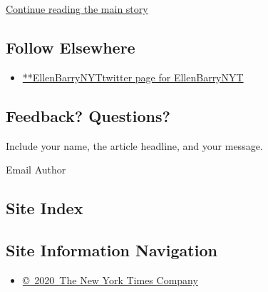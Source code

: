 \protect\hyperlink{after-mid2}{Continue reading the main story}

\hypertarget{follow-elsewhere}{%
\subsection{Follow Elsewhere}\label{follow-elsewhere}}

\begin{itemize}
\tightlist
\item
  \href{https://twitter.com/EllenBarryNYT}{**EllenBarryNYTtwitter page
  for EllenBarryNYT}
\end{itemize}

\hypertarget{feedback-questions}{%
\subsection{Feedback? Questions?}\label{feedback-questions}}

Include your name, the article headline, and your message.

Email Author

\hypertarget{site-index}{%
\subsection{Site Index}\label{site-index}}

\hypertarget{site-information-navigation}{%
\subsection{Site Information
Navigation}\label{site-information-navigation}}

\begin{itemize}
\tightlist
\item
  \href{https://help.nytimes3xbfgragh.onion/hc/en-us/articles/115014792127-Copyright-notice}{©~2020~The
  New York Times Company}
\end{itemize}


